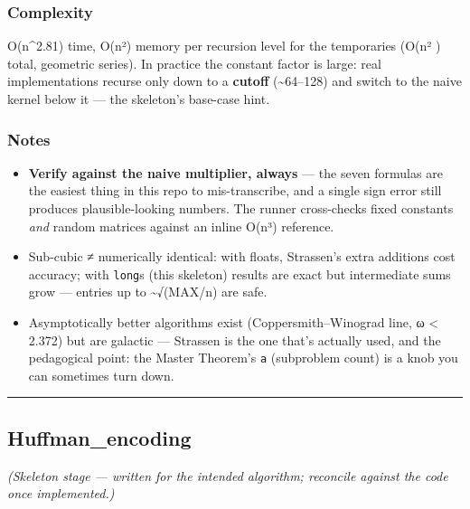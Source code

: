 \documentclass[
  10pt,
  letterpaper,
  onecolumn]{article}
\providecommand{\tightlist}{%
  \setlength{\itemsep}{0pt}\setlength{\parskip}{0pt}}
\begin{document}
\hypertarget{complexity-5}{%
\subsubsection{Complexity}\label{complexity-5}}

O(n\^{}2.81) time, O(n²) memory per recursion level for the temporaries
(O(n² ) total, geometric series). In practice the constant factor is
large: real implementations recurse only down to a \textbf{cutoff}
(\textasciitilde64--128) and switch to the naive kernel below it --- the
skeleton's base-case hint.

\hypertarget{notes-4}{%
\subsubsection{Notes}\label{notes-4}}

\begin{itemize}
\tightlist
\item
  \textbf{Verify against the naive multiplier, always} --- the seven
  formulas are the easiest thing in this repo to mis-transcribe, and a
  single sign error still produces plausible-looking numbers. The runner
  cross-checks fixed constants \emph{and} random matrices against an
  inline O(n³) reference.
\item
  Sub-cubic ≠ numerically identical: with floats, Strassen's extra
  additions cost accuracy; with \texttt{long}s (this skeleton) results
  are exact but intermediate sums grow --- entries up to
  \textasciitilde√(MAX/n) are safe.
\item
  Asymptotically better algorithms exist (Coppersmith--Winograd line, ω
  \textless{} 2.372) but are galactic --- Strassen is the one that's
  actually used, and the pedagogical point: the Master Theorem's
  \texttt{a} (subproblem count) is a knob you can sometimes turn down.
\end{itemize}

\begin{center}\rule{0.5\linewidth}{0.5pt}\end{center}

\hypertarget{huffman_encoding}{%
\subsection{Huffman\_encoding}\label{huffman_encoding}}

\emph{(Skeleton stage --- written for the intended algorithm; reconcile
against the code once implemented.)}
\end{document}

